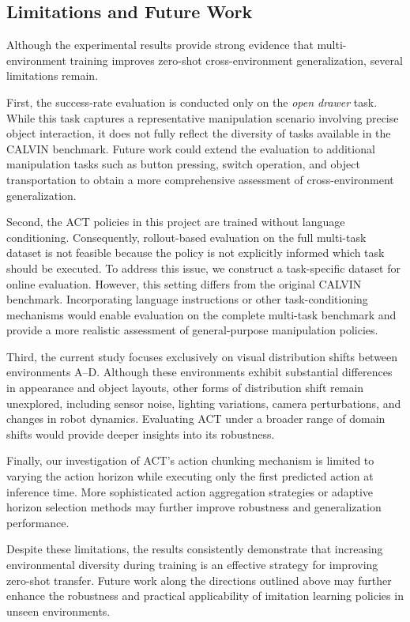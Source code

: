 \subsection{Limitations and Future Work}

Although the experimental results provide strong evidence that multi-environment training improves zero-shot cross-environment generalization, several limitations remain.

First, the success-rate evaluation is conducted only on the \textit{open drawer} task. While this task captures a representative manipulation scenario involving precise object interaction, it does not fully reflect the diversity of tasks available in the CALVIN benchmark. Future work could extend the evaluation to additional manipulation tasks such as button pressing, switch operation, and object transportation to obtain a more comprehensive assessment of cross-environment generalization.

Second, the ACT policies in this project are trained without language conditioning. Consequently, rollout-based evaluation on the full multi-task dataset is not feasible because the policy is not explicitly informed which task should be executed. To address this issue, we construct a task-specific dataset for online evaluation. However, this setting differs from the original CALVIN benchmark. Incorporating language instructions or other task-conditioning mechanisms would enable evaluation on the complete multi-task benchmark and provide a more realistic assessment of general-purpose manipulation policies.

Third, the current study focuses exclusively on visual distribution shifts between environments A--D. Although these environments exhibit substantial differences in appearance and object layouts, other forms of distribution shift remain unexplored, including sensor noise, lighting variations, camera perturbations, and changes in robot dynamics. Evaluating ACT under a broader range of domain shifts would provide deeper insights into its robustness.

Finally, our investigation of ACT's action chunking mechanism is limited to varying the action horizon while executing only the first predicted action at inference time. More sophisticated action aggregation strategies or adaptive horizon selection methods may further improve robustness and generalization performance.

Despite these limitations, the results consistently demonstrate that increasing environmental diversity during training is an effective strategy for improving zero-shot transfer. Future work along the directions outlined above may further enhance the robustness and practical applicability of imitation learning policies in unseen environments.


